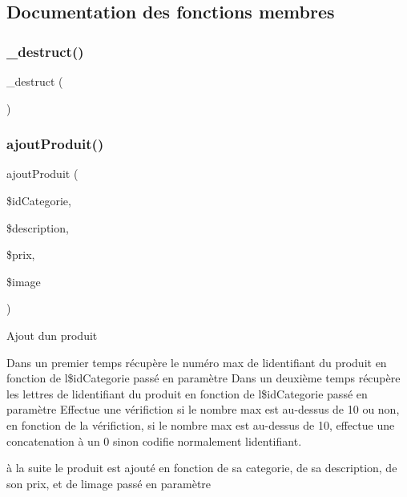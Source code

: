 \subsection{Documentation des fonctions membres}
\mbox{\label{class_pdo_vanille_a1c6024f681d3956654622d9f28e540a2}} 
\subsubsection{\texorpdfstring{\+\_\+destruct()}{\_destruct()}}
{\footnotesize\ttfamily \+\_\+destruct (\begin{DoxyParamCaption}{ }\end{DoxyParamCaption})}

\mbox{\label{class_pdo_vanille_a727d6347dc61edd23bbcb240b4ee01ec}} 
\subsubsection{\texorpdfstring{ajout\+Produit()}{ajoutProduit()}}
{\footnotesize\ttfamily ajout\+Produit (\begin{DoxyParamCaption}\item[{}]{\$id\+Categorie,  }\item[{}]{\$description,  }\item[{}]{\$prix,  }\item[{}]{\$image }\end{DoxyParamCaption})}

Ajout d\textquotesingle{}un produit

Dans un premier temps récupère le numéro max de l\textquotesingle{}identifiant du produit en fonction de l\textquotesingle{}\$id\+Categorie passé en paramètre Dans un deuxième temps récupère les lettres de l\textquotesingle{}identifiant du produit en fonction de l\textquotesingle{}\$id\+Categorie passé en paramètre Effectue une vérifiction si le nombre max est au-\/dessus de 10 ou non, en fonction de la vérifiction, si le nombre max est au-\/dessus de 10, effectue une concatenation à un 0 sinon codifie normalement l\textquotesingle{}identifiant.

à la suite le produit est ajouté en fonction de sa categorie, de sa description, de son prix, et de l\textquotesingle{}image passé en paramètre


